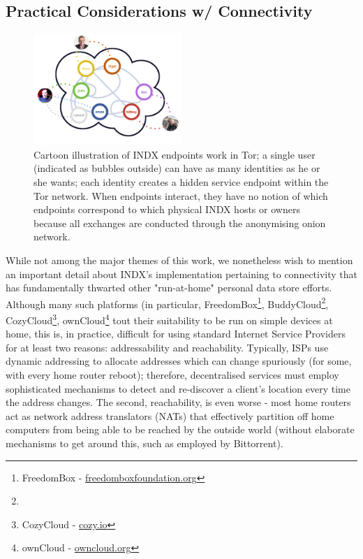\documentclass{sig-alternate}
\begin{document}
\subsection{Practical Considerations w/ Connectivity}

\begin{figure}[t!]
 	  \begin{center}
        \includegraphics[width=0.50\textwidth]{tor}
       \end{center}
    \caption{%
        Cartoon illustration of INDX endpoints work in Tor; a single user (indicated as bubbles outside) can have as many identities as he or she wants; each identity creates a hidden service endpoint within the Tor network. When endpoints interact, they have no notion of which endpoints correspond to which physical INDX hosts or owners because all exchanges are conducted through the anonymising onion network.
    }%
  \label{fig:tor}
\end{figure}


While not among the major themes of this work, we nonetheless wish to mention an important detail about INDX's implementation pertaining to connectivity that has fundamentally thwarted other "run-at-home" personal data store efforts.  Although many such platforms (in particular, FreedomBox\footnote{FreedomBox - \url{freedomboxfoundation.org}}, BuddyCloud\footnote{}, CozyCloud\footnote{CozyCloud - \url{cozy.io}}, ownCloud\footnote{ownCloud - \url{owncloud.org}} tout their suitability to be run on simple devices at home, this is, in practice, difficult for using standard Internet Service Providers for at least two reasons: addressability and reachability.  Typically, ISPs use dynamic addressing to allocate addresses which can change spuriously (for some, with every home router reboot); therefore, decentralised services must employ sophisticated mechanisms to detect and re-discover a client's location every time the address changes.  The second, reachability, is even worse - most home routers act as network address translators (NATs) that effectively partition off home computers from being able to be reached by the outside world (without elaborate mechanisms to get around this, such as employed by Bittorrent).
\end{document}

